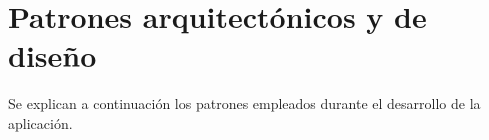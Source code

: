 \section{Patrones arquitectónicos y de diseño}

Se explican a continuación los patrones empleados durante el desarrollo de la aplicación.









